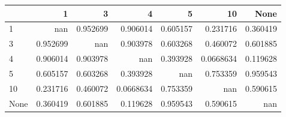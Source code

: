 \begin{tabular}{lrrrrrr}
\toprule
      &          1 &          3 &           4 &          5 &          10 &       None \\
\midrule
 1    & nan        &   0.952699 &   0.906014  &   0.605157 &   0.231716  &   0.360419 \\
 3    &   0.952699 & nan        &   0.903978  &   0.603268 &   0.460072  &   0.601885 \\
 4    &   0.906014 &   0.903978 & nan         &   0.393928 &   0.0668634 &   0.119628 \\
 5    &   0.605157 &   0.603268 &   0.393928  & nan        &   0.753359  &   0.959543 \\
 10   &   0.231716 &   0.460072 &   0.0668634 &   0.753359 & nan         &   0.590615 \\
 None &   0.360419 &   0.601885 &   0.119628  &   0.959543 &   0.590615  & nan        \\
\bottomrule
\end{tabular}